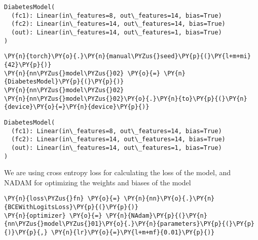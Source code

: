             \begin{tcolorbox}[breakable, size=fbox, boxrule=.5pt, pad at break*=1mm, opacityfill=0]
\begin{Verbatim}[commandchars=\\\{\}]
DiabetesModel(
  (fc1): Linear(in\_features=8, out\_features=14, bias=True)
  (fc2): Linear(in\_features=14, out\_features=14, bias=True)
  (out): Linear(in\_features=14, out\_features=1, bias=True)
)
\end{Verbatim}
\end{tcolorbox}
        
    \begin{tcolorbox}[breakable, size=fbox, boxrule=1pt, pad at break*=1mm,colback=cellbackground, colframe=cellborder]
\begin{Verbatim}[commandchars=\\\{\}]
\PY{n}{torch}\PY{o}{.}\PY{n}{manual\PYZus{}seed}\PY{p}{(}\PY{l+m+mi}{42}\PY{p}{)}
\PY{n}{nn\PYZus{}model\PYZus{}02} \PY{o}{=} \PY{n}{DiabetesModel}\PY{p}{(}\PY{p}{)}
\PY{n}{nn\PYZus{}model\PYZus{}02}
\PY{n}{nn\PYZus{}model\PYZus{}02}\PY{o}{.}\PY{n}{to}\PY{p}{(}\PY{n}{device}\PY{o}{=}\PY{n}{device}\PY{p}{)}
\end{Verbatim}
\end{tcolorbox}

            \begin{tcolorbox}[breakable, size=fbox, boxrule=.5pt, pad at break*=1mm, opacityfill=0]
\begin{Verbatim}[commandchars=\\\{\}]
DiabetesModel(
  (fc1): Linear(in\_features=8, out\_features=14, bias=True)
  (fc2): Linear(in\_features=14, out\_features=14, bias=True)
  (out): Linear(in\_features=14, out\_features=1, bias=True)
)
\end{Verbatim}
\end{tcolorbox}
        
    We are using cross entropy loss for calculating the loss of the model,
and NADAM for optimizing the weights and biases of the model

    \begin{tcolorbox}[breakable, size=fbox, boxrule=1pt, pad at break*=1mm,colback=cellbackground, colframe=cellborder]
\begin{Verbatim}[commandchars=\\\{\}]
\PY{n}{loss\PYZus{}fn} \PY{o}{=} \PY{n}{nn}\PY{o}{.}\PY{n}{BCEWithLogitsLoss}\PY{p}{(}\PY{p}{)}
\PY{n}{optimizer} \PY{o}{=} \PY{n}{NAdam}\PY{p}{(}\PY{n}{nn\PYZus{}model\PYZus{}01}\PY{o}{.}\PY{n}{parameters}\PY{p}{(}\PY{p}{)}\PY{p}{,} \PY{n}{lr}\PY{o}{=}\PY{l+m+mf}{0.01}\PY{p}{)}
\end{Verbatim}
\end{tcolorbox}

